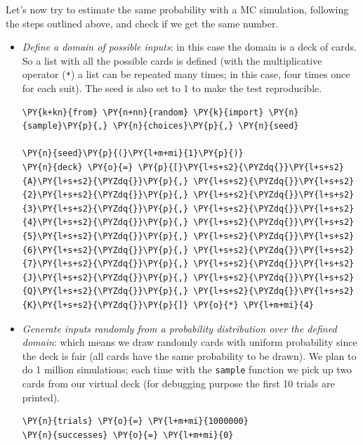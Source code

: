 Let's now try to estimate the same probability with a MC simulation, following
the steps outlined above, and check if we get the same number.
\begin{itemize}
\item \emph{Define a domain of possible inputs}: in this case the domain is a deck of cards. So a list with all the possible cards is defined (with the multiplicative operator (\texttt{*}) a list can be repeated many times; in this case, four times once for each suit). The seed is also set to 1 to make the
test reproducible.

\begin{codebox}
\begin{Verbatim}[commandchars=\\\{\}]
\PY{k+kn}{from} \PY{n+nn}{random} \PY{k}{import} \PY{n}{sample}\PY{p}{,} \PY{n}{choices}\PY{p}{,} \PY{n}{seed}

\PY{n}{seed}\PY{p}{(}\PY{l+m+mi}{1}\PY{p}{)}
\PY{n}{deck} \PY{o}{=} \PY{p}{[}\PY{l+s+s2}{\PYZdq{}}\PY{l+s+s2}{A}\PY{l+s+s2}{\PYZdq{}}\PY{p}{,} \PY{l+s+s2}{\PYZdq{}}\PY{l+s+s2}{2}\PY{l+s+s2}{\PYZdq{}}\PY{p}{,} \PY{l+s+s2}{\PYZdq{}}\PY{l+s+s2}{3}\PY{l+s+s2}{\PYZdq{}}\PY{p}{,} \PY{l+s+s2}{\PYZdq{}}\PY{l+s+s2}{4}\PY{l+s+s2}{\PYZdq{}}\PY{p}{,} \PY{l+s+s2}{\PYZdq{}}\PY{l+s+s2}{5}\PY{l+s+s2}{\PYZdq{}}\PY{p}{,} \PY{l+s+s2}{\PYZdq{}}\PY{l+s+s2}{6}\PY{l+s+s2}{\PYZdq{}}\PY{p}{,} \PY{l+s+s2}{\PYZdq{}}\PY{l+s+s2}{7}\PY{l+s+s2}{\PYZdq{}}\PY{p}{,} \PY{l+s+s2}{\PYZdq{}}\PY{l+s+s2}{J}\PY{l+s+s2}{\PYZdq{}}\PY{p}{,} \PY{l+s+s2}{\PYZdq{}}\PY{l+s+s2}{Q}\PY{l+s+s2}{\PYZdq{}}\PY{p}{,} \PY{l+s+s2}{\PYZdq{}}\PY{l+s+s2}{K}\PY{l+s+s2}{\PYZdq{}}\PY{p}{]} \PY{o}{*} \PY{l+m+mi}{4}
 \end{Verbatim}
\end{codebox}

\item \emph{Generate inputs randomly from a probability distribution over the defined domain}: which means we draw randomly cards with uniform probability since the deck is fair (all cards have the same probability to be drawn). 
We plan to do 1 million simulations; each time with the \texttt{sample} function we pick up two cards from our virtual deck (for debugging purpose the first 10 trials are printed).

\begin{codebox}
\begin{Verbatim}[commandchars=\\\{\}]
\PY{n}{trials} \PY{o}{=} \PY{l+m+mi}{1000000}
\PY{n}{successes} \PY{o}{=} \PY{l+m+mi}{0}


\end{Verbatim}
\end{codebox}
\end{itemize}
